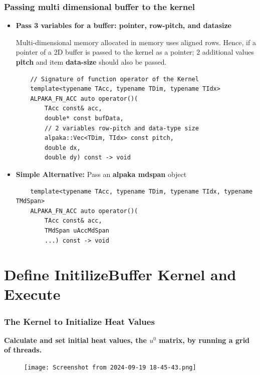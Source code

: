 \documentclass[9pt]{beamer}
\begin{document}
\begin{frame}[fragile]
\small
\frametitle{Passing multi dimensional buffer to the kernel}
 \begin{itemize}
 \item \textbf{Pass 3 variables for a buffer: pointer, row-pitch, and datasize}

Multi-dimensional memory allocated in memory uses aligned rows.
Hence, if a pointer of a 2D buffer is passed to the kernel as a pointer; 2 additional values \textbf{pitch} and item \textbf{data-size} should also be passed.

        \lstset{basicstyle=\ttfamily\scriptsize}
        \begin{lstlisting}
    // Signature of function operator of the Kernel
    template<typename TAcc, typename TDim, typename TIdx>
    ALPAKA_FN_ACC auto operator()(
        TAcc const& acc,
        double* const bufData,
        // 2 variables row-pitch and data-type size
        alpaka::Vec<TDim, TIdx> const pitch,
        double dx,
        double dy) const -> void
        \end{lstlisting}

        \hspace{-0.2\baselineskip}


\item \textbf{Simple Alternative:} Pass an \textbf{alpaka mdspan} object
\lstset{basicstyle=\ttfamily\scriptsize}
\begin{lstlisting}
    template<typename TAcc, typename TDim, typename TIdx, typename TMdSpan>
    ALPAKA_FN_ACC auto operator()(
        TAcc const& acc,
        TMdSpan uAccMdSpan
        ...) const -> void
\end{lstlisting}
\end{itemize}
\end{frame}



\section{Define InitilizeBuffer Kernel and Execute}

\begin{frame}
\frametitle{The Kernel to Initialize Heat Values}
\textbf{Calculate and set initial heat values, the $u^{0}$ matrix, by running a grid of threads.}
\hspace{2.0\baselineskip}
\begin{figure}
    \centering
    \texttt{[image: Screenshot from 2024-09-19 18-45-43.png]}
    \label{fig:enter-label}
\end{figure}
\end{frame}
\end{document}

